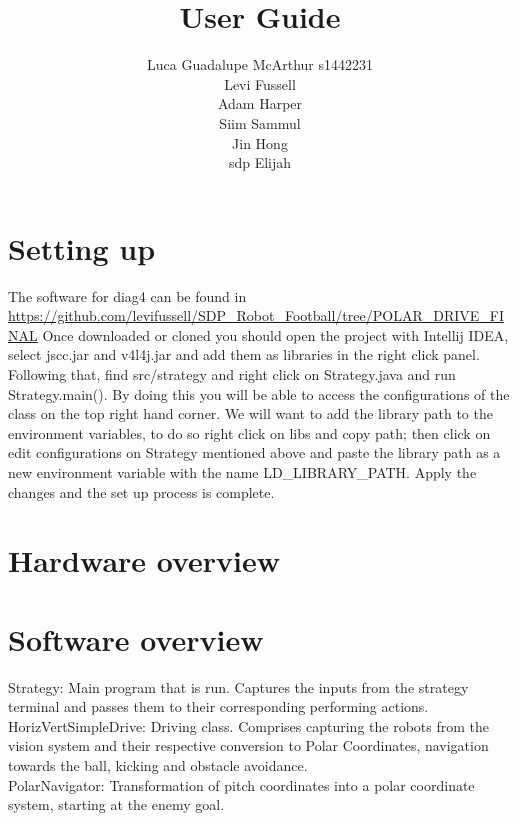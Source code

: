 \documentclass[10pt]{article}
\begin{document}
\title{User Guide}
\author{Luca Guadalupe McArthur s1442231 \\ Levi Fussell \\ Adam Harper \\ Siim Sammul \\ Jin Hong \\ sdp Elijah}
\maketitle

\newpage

\tableofcontents

\pagebreak

\section{Setting up}
The software for diag4 can be found in \url{https://github.com/levifussell/SDP_Robot_Football/tree/POLAR_DRIVE_FINAL} Once downloaded or cloned you should open the project with Intellij IDEA, select jscc.jar and v4l4j.jar and add them as libraries in the right click panel. Following that, find src/strategy and right click on Strategy.java and run Strategy.main(). By doing this you will be able to access the configurations of the class on the top right hand corner. We will want to add the library path to the environment variables, to do so right click on libs and copy path; then click on edit configurations on Strategy mentioned above and paste the library path as a new environment variable with the name LD\_LIBRARY\_PATH. Apply the changes and the set up process is complete.

\section{Hardware overview}
\section{Software overview}
Strategy: Main program that is run. Captures the inputs from the strategy terminal and passes them to their corresponding performing actions. \\
HorizVertSimpleDrive: Driving class. Comprises capturing the robots from the vision system and their respective conversion to Polar Coordinates, navigation towards the ball, kicking and obstacle avoidance. \\
PolarNavigator: Transformation of pitch coordinates into a polar coordinate system, starting at the enemy goal.
\end{document}
